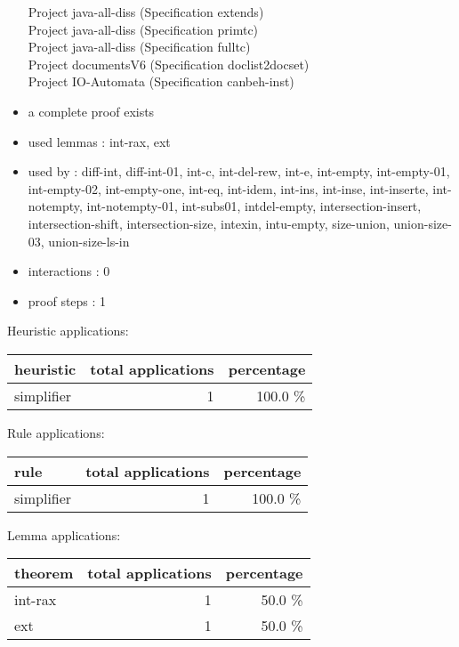 \documentclass[a4paper]{article}
\begin{document}
\begin{itemize}
Project java-all-diss (Specification extends) \\
Project java-all-diss (Specification primtc) \\
Project java-all-diss (Specification fulltc) \\
Project documentsV6 (Specification doclist2docset) \\
Project IO-Automata (Specification canbeh-inst)
\item       a complete proof exists
\item       used lemmas  : int-rax, ext
\item       used by      : diff-int, diff-int-01, int-c, int-del-rew, int-e, int-empty, int-empty-01, int-empty-02, int-empty-one, int-eq, int-idem, int-ins, int-inse, int-inserte, int-notempty, int-notempty-01, int-subs01, intdel-empty, intersection-insert, intersection-shift, intersection-size, intexin, intu-empty, size-union, union-size-03, union-size-ls-in
\item       interactions : 0
\item       proof steps  : 1
\end{itemize}

\medskip


Heuristic applications:

\begin{supertabular}{l|r|r}
heuristic	& total applications & percentage \\ \hline
simplifier & 1 & 100.0 \% \\

\end{supertabular}

Rule applications:

\begin{supertabular}{l|r|r}
rule	        & total applications & percentage \\ \hline
simplifier & 1 & 100.0 \% \\

\end{supertabular}

Lemma applications:

\begin{supertabular}{l|r|r}
theorem	        & total applications & percentage \\ \hline
int-rax & 1 & 50.0 \% \\
ext & 1 & 50.0 \% \\

\end{supertabular}
\pagebreak
\end{document}
